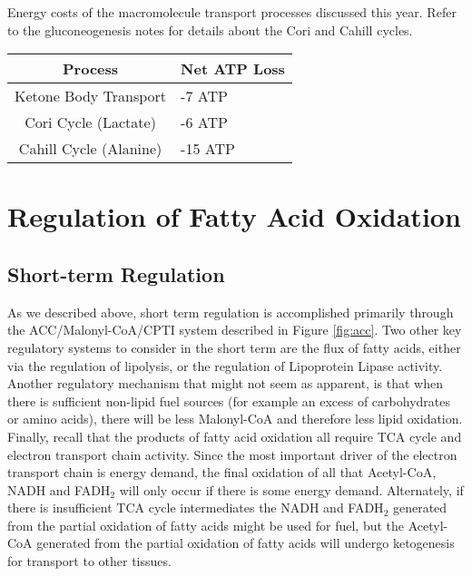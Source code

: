 \documentclass{tufte-handout}
\begin{document}
\begin{margintable}
\centering
\caption{Energy costs of the macromolecule transport processes discussed this year.  Refer to the gluconeogenesis notes for details about the Cori and Cahill cycles.}
\label{tab:transport-processes}
\begin{tabular}{@{}cl@{}}
\toprule
\textbf{Process} & \textbf{Net ATP Loss} \\ \midrule
Ketone Body Transport  &  -7 ATP  \\
Cori Cycle (Lactate)    & -6 ATP  \\
Cahill Cycle (Alanine)       & -15 ATP \\ \bottomrule
\end{tabular}
\end{margintable}

\section{Regulation of Fatty Acid Oxidation}

\subsection{Short-term Regulation}

As we described above, short term regulation is accomplished primarily through the ACC/Malonyl-CoA/CPTI system described in Figure \ref{fig:acc}.  Two other key regulatory systems to consider in the short term are the flux of fatty acids, either via the regulation of lipolysis, or the regulation of Lipoprotein Lipase activity.  Another regulatory mechanism that might not seem as apparent, is that when there is sufficient non-lipid fuel sources (for example an excess of carbohydrates or amino acids), there will be less Malonyl-CoA and therefore less lipid oxidation.  Finally, recall that the products of fatty acid oxidation all require TCA cycle and electron transport chain activity.  Since the most important driver of the electron transport chain is energy demand, the final oxidation of all that Acetyl-CoA, NADH and FADH$_2$ will only occur if there is some energy demand.   Alternately, if there is insufficient TCA cycle intermediates the NADH and FADH$_2$ generated from the partial oxidation of fatty acids might be used for fuel, but the Acetyl-CoA generated from the partial oxidation of fatty acids will undergo ketogenesis for transport to other tissues.
\end{document}
